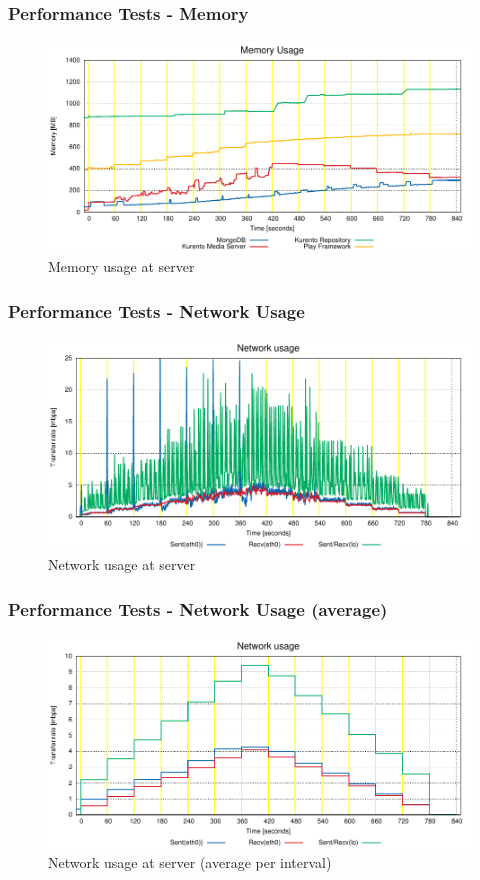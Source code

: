 \documentclass[compress]{beamer}
\begin{document}
	\begin{frame}[c]
		\frametitle{Performance Tests - Memory}
		\begin{figure}[H]
			\includegraphics[width=\textwidth]{figures/ram.pdf}
			\caption{Memory usage at server}
		\end{figure}
	\end{frame}
	\begin{frame}[c]
		\frametitle{Performance Tests - Network Usage}
		\begin{figure}[H]
			\includegraphics[width=\textwidth]{figures/net.pdf}
			\caption{Network usage at server}
		\end{figure}
	\end{frame}
	\begin{frame}[c]
		\frametitle{Performance Tests - Network Usage (average)}
		\begin{figure}[H]
			\includegraphics[width=\textwidth]{figures/net_avg.pdf}
			\caption{Network usage at server (average per interval)}
		\end{figure}
	\end{frame}
\end{document}

